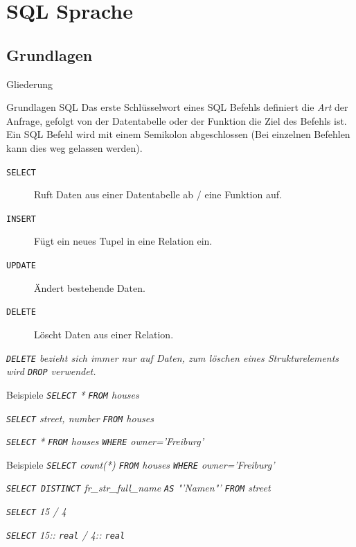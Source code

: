 \documentclass[18pt]{beamer}
\newcommand{\sql}[1]{%
\texttt{\color{sql}#1}
}
\begin{document}
\section{SQL Sprache}

\subsection{Grundlagen}

\begin{frame}{Gliederung}
\end{frame}

\begin{frame}{Grundlagen SQL}
Das erste Schlüsselwort eines SQL Befehls definiert die \textit{Art} der Anfrage, gefolgt von der Datentabelle oder der Funktion die Ziel des Befehls ist. Ein SQL Befehl wird mit einem Semikolon abgeschlossen (Bei einzelnen Befehlen kann dies weg gelassen werden).
\begin{description}
\item [\sql{SELECT}] Ruft Daten aus einer Datentabelle ab / eine Funktion auf.
\item [\sql{INSERT}] Fügt ein neues Tupel in eine Relation ein.
\item [\sql{UPDATE}] Ändert bestehende Daten.
\item [\sql{DELETE}] Löscht Daten aus einer Relation.
\end{description}
\textit{\footnotesize\sql{DELETE} bezieht sich immer nur auf Daten, zum löschen eines Strukturelements wird \sql{DROP} verwendet.}
\end{frame}

\begin{frame}{Beispiele}
\textit{\sql{SELECT} * \sql{FROM} houses}\bigskip\par
\textit{\sql{SELECT} street, number \sql{FROM} houses}\bigskip\par
\textit{\sql{SELECT} * \sql{FROM} houses \sql{WHERE} owner='Freiburg'}\bigskip\par
\end{frame}

\begin{frame}{Beispiele}
\textit{\sql{SELECT} count(*) \sql{FROM} houses \sql{WHERE} owner='Freiburg'}\bigskip\par
\textit{\sql{SELECT DISTINCT} fr\_str\_full\_name \sql{AS} "'Namen"' \sql{FROM} street}\bigskip\par
\textit{\sql{SELECT} 15 / 4}\bigskip\par
\textit{\sql{SELECT} 15::\sql{real} / 4::\sql{real}}
\end{frame}
\end{document}
